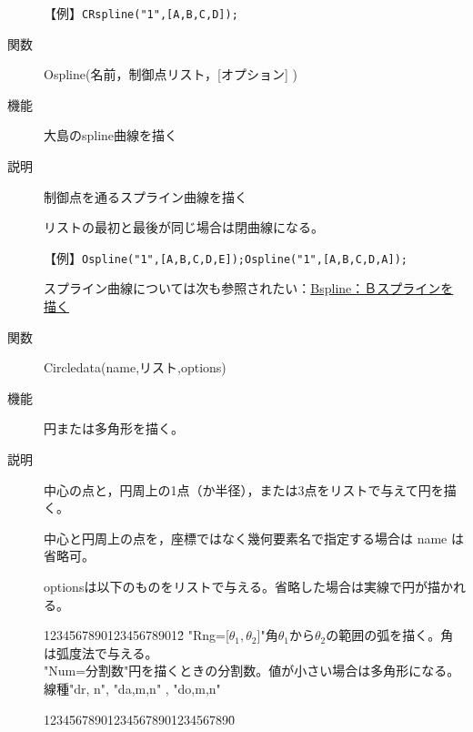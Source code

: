 \documentclass[papersize,a4paper,10pt,uplatex]{jsarticle}
\begin{document}
\begin{description}
\vspace{\baselineskip}
【例】\verb|CRspline("1",[A,B,C,D]);|

\hspace{20mm} 


\vspace{\baselineskip}
\hypertarget{ospline}{}
\item[関数]Ospline(名前，制御点リスト，[オプション] )
\item[機能]大島のspline曲線を描く
\item[説明]制御点を通るスプライン曲線を描く

リストの最初と最後が同じ場合は閉曲線になる。

\vspace{\baselineskip}
【例】\verb|Ospline("1",[A,B,C,D,E]);|\verb|Ospline("1",[A,B,C,D,A]);|

 

\vspace{\baselineskip}
 スプライン曲線については次も参照されたい：\hyperlink{bspline}{Bspline：Ｂスプラインを描く} 


\vspace{\baselineskip}
\hypertarget{circledata}{}
\item[関数]Circledata(name,リスト,options)
\item[機能]円または多角形を描く。
\item[説明]中心の点と，円周上の1点（か半径），または3点をリストで与えて円を描く。

中心と円周上の点を，座標ではなく幾何要素名で指定する場合は name は省略可。

optionsは以下のものをリストで与える。省略した場合は実線で円が描かれる。
\begin{tabbing}
1234\=567890123456789012\=\kill
 \>"Rng=[$\theta_1,\theta_2$]"\>角$\theta_1$から$\theta_2$の範囲の弧を描く。角は弧度法で与える。\\
 \>"Num=分割数"\>円を描くときの分割数。値が小さい場合は多角形になる。\\
 \>線種\>"dr, n", "da,m,n" , "do,m,n"
\end{tabbing}
\begin{tabbing}
1234\=56789012345678901234567890\=\kill


\end{tabbing}
\end{description}
\end{document}
